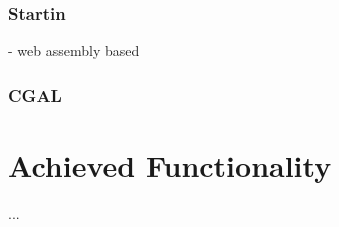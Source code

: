 


\subsubsection{ Startin }
- web assembly based

\subsubsection{ CGAL }




\section{Achieved Functionality}

...




